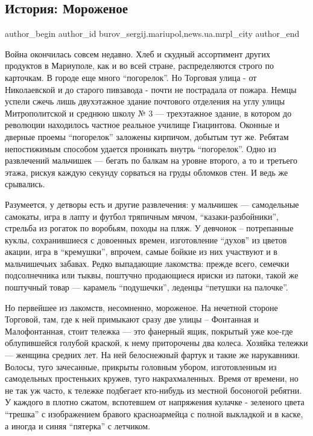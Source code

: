  
 
 
 
 
 
\subsection{История: Мороженое}
\label{sec:02_09_2017.stz.news.ua.mrpl_city.1.istoria_morozhenoe}
 
\ifcmt
 author_begin
   author_id burov_sergij.mariupol,news.ua.mrpl_city
 author_end
\fi

Война окончилась совсем недавно. Хлеб и скудный ассортимент других продуктов в
Мариуполе, как и во всей стране, распределяются строго по карточкам. В городе
еще много \enquote{погорелок}. Но Торговая улица - от Николаевской и до старого
пивзавода - почти не пострадала от пожара. Немцы успели сжечь лишь двухэтажное
здание почтового отделения на углу улицы Митрополитской и среднюю школу № 3 —
трехэтажное здание, в котором до революции находилось частное реальное училище
Гиацинтова. Оконные и дверные проемы \enquote{погорелок} заложены кирпичом,
добытым тут же. Ребятам непостижимым способом удается проникать внутрь
\enquote{погорелок}. Одно из развлечений мальчишек — бегать по балкам на уровне
второго, а то и третьего этажа, рискуя каждую секунду сорваться на груды
обломков стен. И ведь же срывались.

Разумеется, у детворы есть и другие развлечения: у мальчишек — самодельные
самокаты, игра в лапту и футбол тряпичным мячом, \enquote{казаки-разбойники}, стрельба
из рогаток по воробьям, походы на пляж. У девчонок – потрепанные куклы,
сохранившиеся с довоенных времен, изготовление \enquote{духов} из цветов акации, игра в
\enquote{кремушки}, впрочем, самые бойкие из них участвуют и в мальчишечьих забавах.
Редко выпадающие лакомства: прежде всего, семечки подсолнечника или тыквы,
поштучно продающиеся ириски из патоки, такой же поштучный товар — карамель
\enquote{подушечки}, леденцы \enquote{петушки на палочке}. 

Но первейшее из лакомств, несомненно, мороженое. На нечетной стороне Торговой,
там, где к ней примыкают сразу две улицы – Фонтанная  и Малофонтанная, стоит
тележка — это фанерный ящик, покрытый уже кое-где облупившейся голубой краской,
к нему приторочены два колеса. Хозяйка тележки — женщина средних лет. На ней
белоснежный фартук и такие же нарукавники. Волосы, туго зачесанные, прикрыты
головным убором, изготовленным из самодельных простеньких кружев, туго
накрахмаленных. Время от времени, но не так уж часто, к тележке подбегает
кто-нибудь из местной босоногой ребятни. У каждого в плотно сжатом, вспотевшем
от напряжения кулачке - зеленого цвета \enquote{трешка} с изображением бравого
красноармейца с полной выкладкой и в каске, а иногда и синяя \enquote{пятерка} с
летчиком. 

